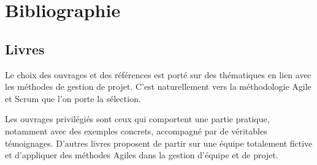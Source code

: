 \chapter{Bibliographie}

\section{Livres}
Le choix des ouvrages et des références est porté sur des thématiques en lien avec les méthodes de gestion de projet. C'est naturellement vers la méthodologie Agile et Scrum que l'on porte la sélection. 

Les ouvrages privilégiés sont ceux qui comportent une partie pratique, notamment avec des exemples concrets, accompagné par de véritables témoignages. D'autres livres proposent de partir sur une équipe totalement fictive et d'appliquer des méthodes Agiles dans la gestion d'équipe et de projet.

